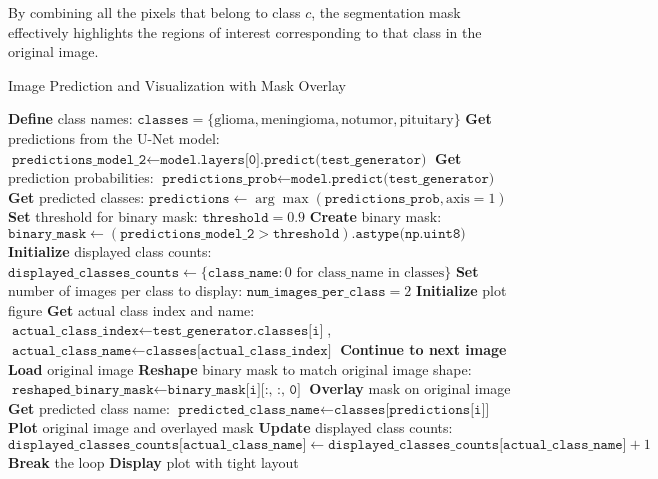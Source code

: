 By combining all the pixels that belong to class $c$, the segmentation mask effectively highlights the regions of interest corresponding to that class in the original image.

\begin{algorithm}[H]
\caption{Image Prediction and Visualization with Mask Overlay}\label{alg:unet_visualization}
\begin{algorithmic}[1]
\State \textbf{Define} class names: $\texttt{classes} = \{\text{glioma}, \text{meningioma}, \text{notumor}, \text{pituitary}\}$
\State \textbf{Get} predictions from the U-Net model: $\texttt{predictions\_model\_2} \leftarrow \texttt{model.layers[0].predict(test\_generator)}$
\State \textbf{Get} prediction probabilities: $\texttt{predictions\_prob} \leftarrow \texttt{model.predict(test\_generator)}$
\State \textbf{Get} predicted classes: $\texttt{predictions} \leftarrow \arg\max(\texttt{predictions\_prob}, \text{axis}=1)$
\State \textbf{Set} threshold for binary mask: $\texttt{threshold} = 0.9$
\State \textbf{Create} binary mask: $\texttt{binary\_mask} \leftarrow (\texttt{predictions\_model\_2} > \texttt{threshold}).\texttt{astype(np.uint8)}$
\State \textbf{Initialize} displayed class counts: $\texttt{displayed\_classes\_counts} \leftarrow \{ \texttt{class\_name}: 0 \text{ for class\_name in classes} \}$
\State \textbf{Set} number of images per class to display: $\texttt{num\_images\_per\_class} = 2$
\State \textbf{Initialize} plot figure
    \State \textbf{Get} actual class index and name: $\texttt{actual\_class\_index} \leftarrow \texttt{test\_generator.classes[i]}$, $\texttt{actual\_class\_name} \leftarrow \texttt{classes[actual\_class\_index]}$
        \State \textbf{Continue to next image}
    \EndIf
    \State \textbf{Load} original image
    \State \textbf{Reshape} binary mask to match original image shape: $\texttt{reshaped\_binary\_mask} \leftarrow \texttt{binary\_mask[i][:, :, 0]}$
    \State \textbf{Overlay} mask on original image
    \State \textbf{Get} predicted class name: $\texttt{predicted\_class\_name} \leftarrow \texttt{classes[predictions[i]]}$
    \State \textbf{Plot} original image and overlayed mask
    \State \textbf{Update} displayed class counts: $\texttt{displayed\_classes\_counts[actual\_class\_name]} \leftarrow \texttt{displayed\_classes\_counts[actual\_class\_name]} + 1$
        \State \textbf{Break} the loop
    \EndIf
\EndFor
\State \textbf{Display} plot with tight layout
\end{algorithmic}
\end{algorithm}

